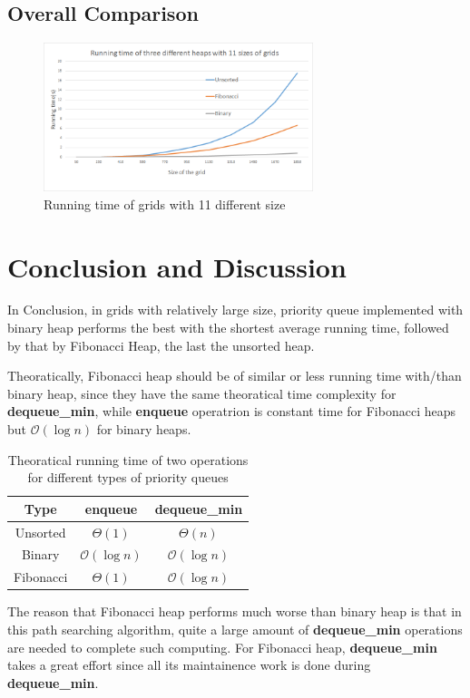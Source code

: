 \documentclass[12pt,a4paper]{article}
\theoremstyle{definition}
\begin{document}
\subsection{Overall Comparison}
\begin{figure}[htbp]
    \centering
    \includegraphics[width=0.7\textwidth]{three.png}
    \caption{Running time of grids with 11 different size}
\end{figure}
\section{Conclusion and Discussion}
\par In Conclusion, in grids with relatively large size, priority queue implemented with binary heap performs the best with the shortest average running time, followed by that by Fibonacci Heap, the last the unsorted heap.
\par Theoratically, Fibonacci heap should be of similar or less running time with/than binary heap, since they have the same theoratical time complexity for \textbf{dequeue\_min}, while \textbf{enqueue} operatrion is constant time for Fibonacci heaps but $\mathcal{O}(\log n)$ for binary heaps.
\begin{table}[h]
    \centering
    \begin{tabular}{|c|c|c|}
    \hline
    Type & enqueue & dequeue\_min \\ \hline
    Unsorted  & $\Theta(1)$ & $\Theta(n)$ \\ \hline
    Binary  & $\mathcal{O}(\log n)$ & $\mathcal{O}(\log n)$ \\ \hline
    Fibonacci  & $\Theta(1)$ & $\mathcal{O}(\log n)$ \\ \hline
    \end{tabular}
    \caption{Theoratical running time of two operations for different types of priority queues}
    \label{tab:my-table}
\end{table}
\par The reason that Fibonacci heap performs much worse than binary heap is that in this path searching algorithm, quite a large amount of \textbf{dequeue\_min} operations are needed to complete such computing. For Fibonacci heap, \textbf{dequeue\_min} takes a great effort since all its maintainence work is done during \textbf{dequeue\_min}.
\newpage
\end{document}
